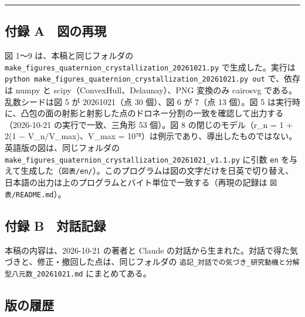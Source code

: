 \documentclass[
  a4paper,
]{ltjsarticle}
\begin{document}
\begin{center}\rule{0.5\linewidth}{0.5pt}\end{center}

\subsection{付録
A　図の再現}\label{ux4ed8ux9332-a-ux56f3ux306eux518dux73fe}

図 1〜9 は、本稿と同じフォルダの
\texttt{make\_\allowbreak{}figures\_\allowbreak{}quaternion\_\allowbreak{}crystallization\_\allowbreak{}20261021.py}
で生成した。実行は
\texttt{python\ make\_\allowbreak{}figures\_\allowbreak{}quaternion\_\allowbreak{}crystallization\_\allowbreak{}20261021.py\ out}
で、依存は numpy と scipy（ConvexHull、Delaunay）、PNG 変換のみ cairosvg
である。乱数シードは図 5 が 20261021（点 30 個）、図 6 が 7（点 13
個）。図 5
は実行時に、凸包の面の射影と射影した点のドロネー分割の一致を確認して出力する（2026-10-21
の実行で一致、三角形 53 個）。図 8 の閉じのモデル（r\_n = 1 + 2(1 −
V\_n/V\_max)、V\_max =
10⁷⁸）は例示であり、導出したものではない。英語版の図は、同じフォルダの
\texttt{make\_\allowbreak{}figures\_\allowbreak{}quaternion\_\allowbreak{}crystallization\_\allowbreak{}20261021\_\allowbreak{}v1.1.py}
に引数 \texttt{en}
を与えて生成した（\texttt{図表/\allowbreak{}en/\allowbreak{}}）。このプログラムは図の文字だけを日英で切り替え、日本語の出力は上のプログラムとバイト単位で一致する（再現の記録は
\texttt{図表/\allowbreak{}README.md}）。

\subsection{付録
B　対話記録}\label{ux4ed8ux9332-b-ux5bfeux8a71ux8a18ux9332}

本稿の内容は、2026-10-21 の著者と Claude
の対話から生まれた。対話で得た気づきと、修正・撤回した点は、同じフォルダの
\texttt{追記\_\allowbreak{}対話での気づき\_\allowbreak{}研究動機と分解型八元数\_\allowbreak{}20261021.md}
にまとめてある。

\subsection{版の履歴}\label{ux7248ux306eux5c65ux6b74}
\end{document}
